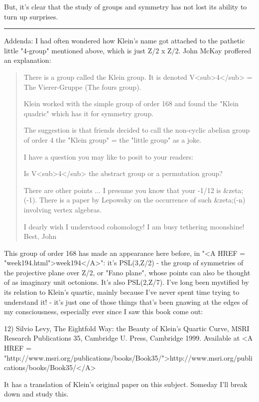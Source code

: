 But, it's clear that the study of groups and symmetry has not lost its
ability to turn up surprises.

\par\noindent\rule{\textwidth}{0.4pt}
Addenda: I had often wondered how Klein's name got attached to the
pathetic little "4-group" mentioned above, which is just Z/2 x Z/2.
John McKay proffered an explanation:

\begin{quote}
 There is a group called the Klein group.
 It is denoted V<sub>4</sub> = The Vierer-Gruppe  (The fours group).

 Klein worked with the simple group of order 168 and found
 the "Klein quadric" which has it for symmetry group.

 The suggestion is that friends decided to call the non-cyclic 
 abelian group of order 4 the "Klein group" = the "little group"
 as a joke.

 I have a question you may like to posit to your readers:

 Is V<sub>4</sub> the abstract group or a permutation group?
 
 There are other points ... I presume you know that your
 -1/12 is &zeta;(-1). There is a paper by Lepowsky on the occurrence
 of such &zeta;(-n) involving vertex algebras.

 I dearly wish I understood cohomology!
 I am busy tethering moonshine!
 Best,
 John
\end{quote}
    

This group of order 168 has made an appearance here before, in "<A HREF
= "week194.html">week194</A>": it's PSL(3,Z/2) - the group of
symmetries of the projective plane over Z/2, or "Fano plane", whose
points can also be thought of as imaginary unit octonions.  It's also
PSL(2,Z/7).  I've long been mystified by its relation to Klein's
quartic, mainly because I've never spent time trying to understand it!
- it's just one of those things that's been gnawing at the edges of my
consciousness, especially ever since I saw this book come out:

12) Silvio Levy, The Eightfold Way: the Beauty of Klein's Quartic Curve,
MSRI Research Publications 35, Cambridge U. Press, Cambridge 1999.
Available at <A HREF = "http://www.msri.org/publications/books/Book35/">http://www.msri.org/publications/books/Book35/</A>

It has a translation of Klein's original paper on this subject.
Someday I'll break down and study this.

